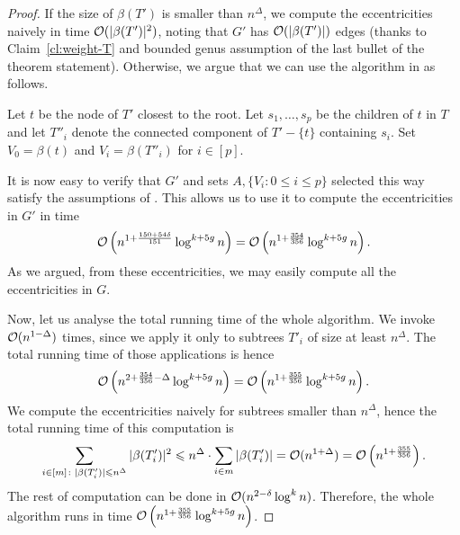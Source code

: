 \begin{proof}
If the size of $\beta(T')$ is smaller than $n^\Delta$, we compute the eccentricities naively in time $\mathcal{O}(|\beta(T')|^2)$, 
noting that $G'$ has $\mathcal{O}(|\beta(T')|)$ edges (thanks to Claim~\ref{cl:weight-T} and bounded genus assumption 
of the last bullet of the theorem statement). Otherwise, we argue that we can use the algorithm in  as follows.

Let $t$ be the node of $T'$ closest to the root. Let $s_1, \dots, s_p$ be the children of $t$ in $T$ and let $T''_i$ denote the connected component of $T' - \{t\}$ containing $s_i$. Set $V_0 = \beta(t)$ and $V_i = \beta(T''_i)$ for $i \in [p]$.

It is now easy to verify that $G'$ and sets $A, \{V_i\colon 0\leq i\leq p\}$ selected this way satisfy the assumptions of . This allows us to use it to compute the eccentricities in $G'$ in time
$$
\mathcal{O} \left( n^{1 + \frac{150 + 54\delta}{151}} \log^{k + 5g} n \right) =
\mathcal{O} \left( n^{1 + \frac{354}{356}} \log^{k + 5g} n \right).
$$
As we argued, from these eccentricities, we may easily compute all the eccentricities in $G$.

Now, let us analyse the total running time of the whole algorithm. We invoke  $\mathcal{O}(n^{1 - \Delta})$ times, since we apply it only to subtrees $T'_i$ of size at least $n^\Delta$. The total running time of those applications is hence
$$
\mathcal{O} \left( n^{2 + \frac{354}{356} - \Delta} \log^{k + 5g} n \right) =
\mathcal{O} \left( n^{1 + \frac{355}{356}} \log^{k + 5g} n \right).
$$
We compute the eccentricities naively for subtrees smaller than $n^\Delta$, hence the total running time of this computation is
$$
\sum_{i \in [m] \colon |\beta(T'_i)| \leqslant n^\Delta} |\beta(T'_i)|^2 \leqslant
n^\Delta \cdot \sum_{i \in m} |\beta(T'_i)| = \mathcal{O}(n^{1 + \Delta})=\mathcal{O}\left(n^{1+\frac{355}{356}}\right).
$$
The rest of computation can be done in $\mathcal{O}(n^{2 - \delta} \log^k n)$. Therefore, the whole algorithm runs in time $\mathcal{O} \left( n^{1 + \frac{355}{356}} \log^{k + 5g} n \right)$.
\end{proof}
